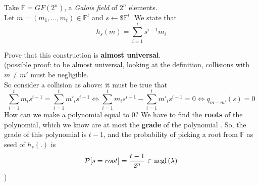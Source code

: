 \begin{construction}
     Take $ \mathbb{F}=GF(2^{n})$, a \textit{Galois field} of $2^{n}$
     elements.\\
     Let $m=(m_{1}, ..., m_{t}) \in \mathbb{F}^{t} $ and $s \leftarrow\$ 
     \mathbb{F}^{t} $. We state that 
     \[
         h_{s}(m)= \sum_{i=1}^{t}s^{i-1}m_{i}
        \]
 \end{construction}


\begin{exercise}
    Prove that this construction is \textbf{almost universal}.\\
    (possible proof: to be almost universal, looking at the definition,
    collisions with $m \not= m'$ must be negligible.\\
    So consider a collision as above: it must be true that  
    \[
     \sum_{i=1}^{t} m_{i}s^{i-1}=\sum_{i=1}^{t} m'_{i}s^{i-1} \Leftrightarrow 
     \sum_{i=1}^{t} m_{i}s^{i-1}-\sum_{i=1}^{t} m'_{i}s^{i-1}=0 \Leftrightarrow
     q_{m-m'}(s)=0
    \]
    How can we make a polynomial equal to 0? We have to find the \textbf{roots}
    of the polynomial, which we know are at most the \textbf{grade} of the polynomial . 
    So, the grade of this polynomial is $t-1$, and the probability of picking a
    root from $ \mathbb{F} $ as seed of $h_{s}(.)$ is 
    \[
        \mathcal{P} [s=root]=\frac{t-1}{2^{n}}   \in \mathrm{negl}\left({\lambda}\right) 
    \] )
\end{exercise}
 